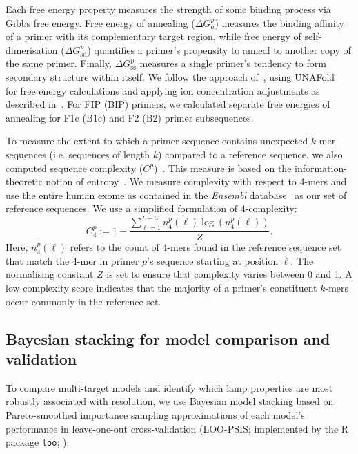 \documentclass[../thesis.tex]{subfiles}
\begin{document}
Each free energy property measures the strength of some binding process via Gibbs free energy. Free energy of annealing ($\Delta G_a^p$) measures the binding affinity of a primer with its complementary target region, while free energy of self-dimerisation ($\Delta G^p_{\text{sd}}$) quantifies a primer's propensity to anneal to another copy of the same primer. Finally, $\Delta G^p_{\text{ss}}$ measures a single primer's tendency to form secondary structure within itself. We follow the approach of~\citet{doring_modeling_2019}, using UNAFold~\citep{markham_unafold_2008} for free energy calculations and applying ion concentration adjustments as described in~\citet{peyret_prediction_2000}. For FIP (BIP) primers, we calculated separate free energies of annealing for F1c (B1c) and F2 (B2) primer subsequences.

To measure the extent to which a primer sequence contains unexpected $k$-mer sequences (i.e. sequences of length $k$) compared to a reference sequence, we also computed sequence complexity ($C^p$)~\citep{nielsen_design_2003, xia_evaluating_2010}. This measure is based on the information-theoretic notion of entropy~\citep{shannon_mathematical_1948}. We measure complexity with respect to 4-mers and use the entire human exome as contained in the \emph{Ensembl} database~\citep{yates_ensembl_2020} as our set of reference sequences. We use a simplified formulation of 4-complexity:
\[C^p_4 := 1 -  \frac{\sum_{\ell = 1}^{L-3} n^p_4(\ell) \log (n^p_4(\ell))}{Z}.\]
Here, $n^p_4(\ell)$ refers to the count of 4-mers found in the reference sequence set that match the 4-mer in primer $p$'s sequence starting at position $\ell$. The normalising constant $Z$ is set to ensure that complexity varies between 0 and 1. A low complexity score indicates that the majority of a primer's constituent $k$-mers occur commonly in the reference set.


\subsection{Bayesian stacking for model comparison and validation \label{sec:stacking}}
To compare multi-target models and identify which \gls{lamp} properties are most robustly associated with resolution, we use Bayesian model stacking based on Pareto-smoothed importance sampling approximations of each model's performance in leave-one-out cross-validation (LOO-PSIS; implemented by the R package \texttt{loo}; \citealp{vehtari_loo_2020}).
\end{document}
